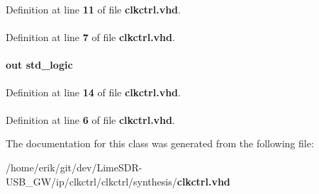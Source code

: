 Definition at line {\bf 11} of file {\bf clkctrl.\+vhd}.

\paragraph[{numeric\+\_\+std}]{\hspace{0.3cm}{\ttfamily [Package]}}\label{classclkctrl_a2edc34402b573437d5f25fa90ba4013e}


Definition at line {\bf 7} of file {\bf clkctrl.\+vhd}.

\paragraph[{outclk}]{ {\bfseries \textcolor{keywordflow}{out}\textcolor{vhdlchar}{ }} {\bfseries \textcolor{comment}{std\+\_\+logic}\textcolor{vhdlchar}{ }} \hspace{0.3cm}{\ttfamily [Port]}}\label{classclkctrl_a4f1b96b50b5c06b10a938f675a4b961b}


Definition at line {\bf 14} of file {\bf clkctrl.\+vhd}.

\paragraph[{std\+\_\+logic\+\_\+1164}]{\hspace{0.3cm}{\ttfamily [Package]}}\label{classclkctrl_acd03516902501cd1c7296a98e22c6fcb}


Definition at line {\bf 6} of file {\bf clkctrl.\+vhd}.



The documentation for this class was generated from the following file\+:\begin{DoxyCompactItemize}
\item 
/home/erik/git/dev/\+Lime\+S\+D\+R-\/\+U\+S\+B\+\_\+\+G\+W/ip/clkctrl/clkctrl/synthesis/{\bf clkctrl.\+vhd}\end{DoxyCompactItemize}
